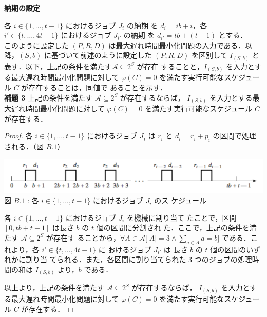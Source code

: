\documentclass[12pt]{optlab-bachelor}
\begin{document}
  \noindent \textbf{納期の設定}

  各 $i \in \{1,\ldots,t - 1\}$ におけるジョブ $J_i$ の納期
  を $d_i = ib + i$，各 $i' \in \{t,\ldots,4t - 1\}$ におけるジョブ $J_{i'}$ の納期
  を $d_{i'} = tb + (t - 1)$ とする．\\

  このように設定した $(P,R,D)$ は最大遅れ時間最小化問題の入力である．以
  降，$(S,b)$ に基づいて前述のように設定した $(P,R,D)$ を区別して
  $I_{(S,b)}$ と表す．以下，上記の条件を満たす$\mathcal{A} \subseteq 2^S$ が存在
  することと，$I_{(S,b)}$ を入力とする最大遅れ時間最小化問題に対して
  $\varphi(C) =  0$
  を満たす実行可能なスケジュール $C$ が存在することは，同値で
  あることを示す．\\

  \noindent \textbf{補題 3}
  上記の条件を満たす $\mathcal{A} \subseteq 2^S$ が存在するならば，
  $I_{(S,b)}$ を入力とする最大遅れ時間最小化問題に対して $\varphi(C) =
  0$ を満たす実行可能なスケジュール $C$ が存在する．\\

  \begin{proof}
    各 $i \in \{1,\ldots,t - 1\}$ におけるジョブ $J_i$ は $r_i$ と $d_i =
    r_i + p_i$ の区間で処理される．（図 $B.1$）
    \begin{center}
      \includegraphics[width = 15cm]{Lmax1.png} \\
      図 $B.1$ : 各 $i \in \{1,\ldots,t - 1\}$ におけるジョブ $J_i$ のス
      ケジュール
    \end{center}
    各 $i \in \{1,\ldots,t - 1\}$ におけるジョブ $J_i$ を機械に割り当て
    たことで，区間 $[0,tb + t - 1]$ は長さ $b$ の $t$ 個の区間に分割され
    た．ここで，上記の条件を満たす $\mathcal{A} \subseteq 2^S$ が存在す
    ることから，$\forall A \in \mathcal{A}\big[|A| = 3 \land \sum_{a \in
    A}a = b \big]$ である．これより，各 $i' \in \{t,\ldots,4t - 1\}$ に
    おけるジョブ $J_{i'}$ は 長さ $b$ の $t$ 個の区間のいずれかに割り当
    てられる．また，各区間に割り当てられた 3 つのジョブの処理時間の和は
    $I_{(S,b)}$ より，$b$ である．

    以上より，上記の条件を満たす $\mathcal{A} \subseteq 2^S$ が存在するならば，
    $I_{(S,b)}$ を入力とする最大遅れ時間最小化問題に対して $\varphi(C) =
    0$ を満たす実行可能なスケジュール $C$ が存在する．
  \end{proof}
\end{document}
